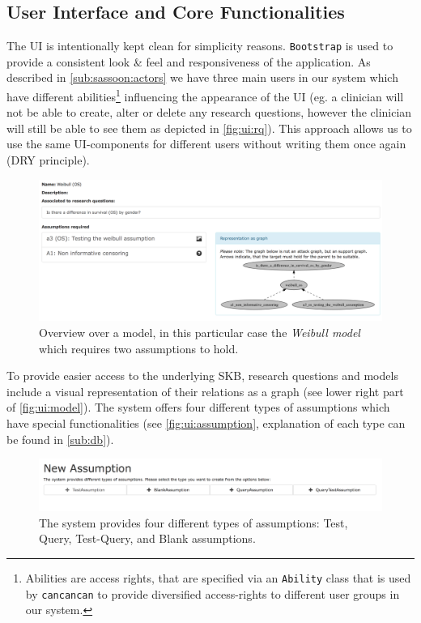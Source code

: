 \subsection{User Interface and Core Functionalities}
\label{sub:ui}

The \gls{UI} is intentionally kept clean for simplicity reasons. \texttt{Bootstrap} is used to provide a consistent look \& feel and responsiveness of the application. As described in \autoref{sub:sassoon:actors} we have three main users in our system which have different abilities\footnote{Abilities are access rights, that are specified via an \texttt{Ability} class that is used by \texttt{cancancan} to provide diversified access-rights to different user groups in our system.} influencing the appearance of the \gls{UI} (eg. a clinician will not be able to create, alter or delete any research questions, however the clinician will still be able to see them as depicted in \autoref{fig:ui:rq}). This approach allows us to use the same \gls{UI}-components for different users without writing them once again (\gls{DRY} principle).

\begin{figure}[tbp]
\centering
\includegraphics[width=\textwidth]{figures/ui_Weibull_Model}
\caption{Overview over a model, in this particular case the \textit{Weibull model} which requires two assumptions to hold.}
\label{fig:ui:model}
\end{figure}


To provide easier access to the underlying \gls{SKB}, research questions and models include a visual representation of their relations as a graph (see lower right part of \autoref{fig:ui:model}). The system offers four different types of assumptions which have special functionalities (see \autoref{fig:ui:assumption}, explanation of each type can be found in \autoref{sub:db}).


\begin{figure}[btp]
	\centering
	\includegraphics[width=\textwidth]{figures/ui_new_assumption}
	\caption{The system provides four different types of assumptions: Test, Query, Test-Query, and Blank assumptions.}
	\label{fig:ui:assumption}
\end{figure}


